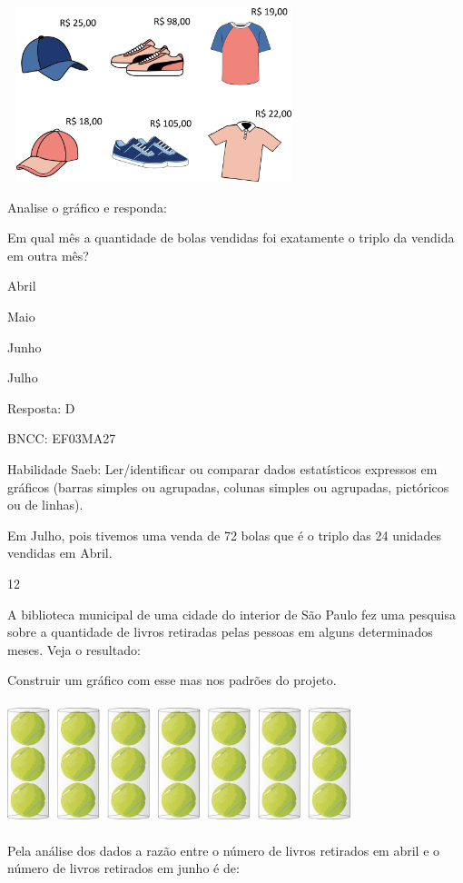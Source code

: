 \begin{escolha}
\begin{escolha}
\includegraphics[width=3.36538in,height=2.00040in]{media/image120.png}

Analise o gráfico e responda:

Em qual mês a quantidade de bolas vendidas foi exatamente o triplo da
vendida em outra mês?

\begin{escolha}
\item
  Abril
\item
  Maio
\item
  Junho
\item
  Julho
\end{escolha}

Resposta: D

BNCC: EF03MA27

Habilidade Saeb: Ler/identificar ou comparar dados estatísticos
expressos em gráficos (barras simples ou agrupadas, colunas simples ou
agrupadas, pictóricos ou de linhas).

Em Julho, pois tivemos uma venda de 72 bolas que é o triplo das 24
unidades vendidas em Abril.

\num{12}

A biblioteca municipal de uma cidade do interior de São Paulo fez uma
pesquisa sobre a quantidade de livros retiradas pelas pessoas em alguns
determinados meses. Veja o resultado:

Construir um gráfico com esse mas nos padrões do projeto.

\includegraphics[width=3.93590in,height=1.40906in]{media/image121.png}

Pela análise dos dados a razão entre o número de livros retirados em
abril e o número de livros retirados em junho é de:


\end{escolha}
\end{escolha}

